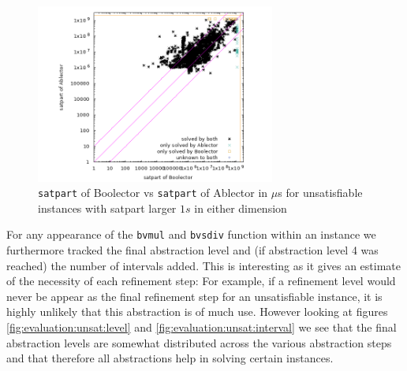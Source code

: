 \begin{figure}[]
    \centering
        \includegraphics[width=0.7\textwidth]{plots/unsat/Boolector-vs-Ablector-satpart-big.png}
    \caption{\texttt{satpart} of Boolector vs \texttt{satpart} of Ablector in $\mu$s for unsatisfiable instances with satpart larger $1s$ in either dimension}
    \label{fig:evaluation:unsat:scatter-big}
\end{figure}
For any appearance of the \texttt{bvmul} and \texttt{bvsdiv} function within an instance we furthermore tracked the final abstraction level and (if abstraction level 4 was reached) the number of intervals added. This is interesting as it gives an estimate of the necessity of each refinement step: For example, if a refinement level would never be appear as the final refinement step for an unsatisfiable instance, it is highly unlikely that this abstraction is of much use. However looking at figures \ref{fig:evaluation:unsat:level} and \ref{fig:evaluation:unsat:interval} we see that the final abstraction levels are somewhat distributed across the various abstraction steps and that therefore all abstractions help in solving certain instances.

